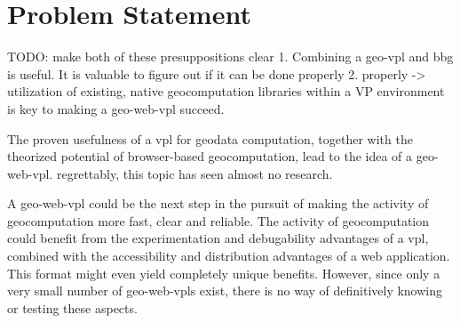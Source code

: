 






\section{Problem Statement}

\begin{note}
  TODO: make both of these presuppositions clear
  1. Combining a geo-vpl and bbg is useful. It is valuable to figure out if it can be done properly
  2. properly -> utilization of existing, native geocomputation libraries within a VP environment is key to making a geo-web-vpl succeed. 
\end{note}

The proven usefulness of a vpl for geodata computation, together with the theorized potential of browser-based geocomputation, lead to the idea of a \ac{geo-web-vpl}. 
regrettably, this topic has seen almost no research. 

A \ac{geo-web-vpl} could be the next step in the pursuit of making the activity of geocomputation more fast, clear and reliable.
The activity of geocomputation could benefit from the experimentation and debugability advantages of a \ac{vpl}, combined with the accessibility and distribution advantages of a web application. 
This format might even yield completely unique benefits.
However, since only a very small number of geo-web-vpls exist, there is no way of definitively knowing or testing these aspects. 

